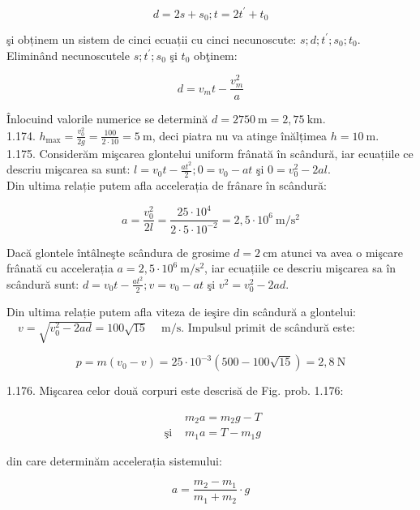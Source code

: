 \documentclass[10pt]{article}
\begin{document}
$$
d=2 s+s_{0} ; t=2 t^{\prime}+t_{0}
$$

şi obținem un sistem de cinci ecuații cu cinci necunoscute: $s ; d ; t^{\prime} ; s_{0} ; t_{0}$. Eliminând necunoscutele $s ; t^{\prime} ; s_{0}$ şi $t_{0}$ obţinem:

$$
d=v_{m} t-\frac{v_{m}^{2}}{a}
$$

Înlocuind valorile numerice se determină $d=2750 \mathrm{~m}=2,75 \mathrm{~km}$.\\
1.174. $h_{\max }=\frac{v_{0}^{2}}{2 g}=\frac{100}{2 \cdot 10}=5 \mathrm{~m}$, deci piatra nu va atinge înălțimea $h=10 \mathrm{~m}$.\\
1.175. Considerăm mişcarea glontelui uniform frânată în scândură, iar ecuațiile ce descriu mişcarea sa sunt: $l=v_{0} t-\frac{a t^{2}}{2} ; 0=v_{0}-a t$ şi $0=v_{0}^{2}-2 a l$.\\
Din ultima relație putem afla accelerația de frânare în scândură:

$$
a=\frac{v_{0}^{2}}{2 l}=\frac{25 \cdot 10^{4}}{2 \cdot 5 \cdot 10^{-2}}=2,5 \cdot 10^{6} \mathrm{~m} / \mathrm{s}^{2}
$$

Dacă glontele întâlneşte scândura de grosime $d=2 \mathrm{~cm}$ atunci va avea o mişcare frânată cu accelerația $a=2,5 \cdot 10^{6} \mathrm{~m} / \mathrm{s}^{2}$, iar ecuațiile ce descriu mişcarea sa în scândură sunt: $d=v_{0} t-\frac{a t^{2}}{2} ; v=v_{0}-a t$ şi $v^{2}=v_{0}^{2}-2 a d$.

Din ultima relație putem afla viteza de ieşire din scândură a glontelui: $\quad v=\sqrt{v_{0}^{2}-2 a d}=100 \sqrt{15} \quad \mathrm{~m} / \mathrm{s}$. Impulsul primit de scândură este:

$$
p=m\left(v_{0}-v\right)=25 \cdot 10^{-3}(500-100 \sqrt{15})=2,8 \mathrm{~N}
$$

1.176. Mişcarea celor două corpuri este descrisă de Fig. prob. 1.176:

$$
\begin{array}{ll} 
& m_{2} a=m_{2} g-T \\
\text { şi } & m_{1} a=T-m_{1} g
\end{array}
$$

din care determinăm accelerația sistemului:

$$
a=\frac{m_{2}-m_{1}}{m_{1}+m_{2}} \cdot g
$$
\end{document}

